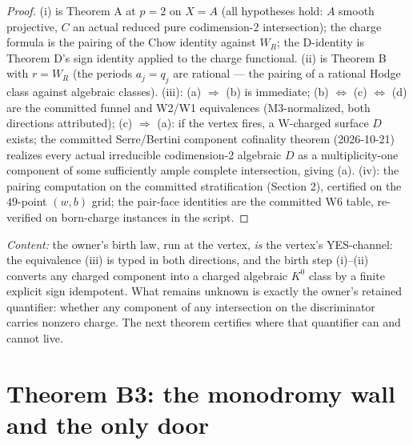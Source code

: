 \documentclass[11pt]{article}
\newcommand{\WR}{W_R}
\newcommand{\KA}{A}
\begin{document}
\begin{proof}
(i) is Theorem A at $p = 2$ on $X = \KA$ (all hypotheses hold: $\KA$ smooth
projective, $C$ an actual reduced pure codimension-2 intersection); the charge
formula is the pairing of the Chow identity against $\WR$; the D-identity is
Theorem D's sign identity applied to the charge functional. (ii) is Theorem B
with $r = \WR$ (the periods $a_j = q_j$ are rational --- the pairing of a
rational Hodge class against algebraic classes). (iii): (a)
$\Rightarrow$ (b) is immediate; (b) $\Leftrightarrow$ (c) $\Leftrightarrow$
(d) are the committed funnel and W2/W1 equivalences (M3-normalized, both
directions attributed); (c) $\Rightarrow$ (a): if the vertex fires, a
W-charged surface $D$ exists; the committed Serre/Bertini component
cofinality theorem (2026-10-21) realizes every actual irreducible
codimension-2 algebraic $D$ as a multiplicity-one component of some
sufficiently ample complete intersection, giving (a). (iv): the pairing
computation on the committed stratification (Section 2), certified on the
$49$-point $(w,b)$ grid; the pair-face identities are the committed W6 table,
re-verified on born-charge instances in the script.
\end{proof}

\emph{Content:} the owner's birth law, run at the vertex, \emph{is} the
vertex's YES-channel: the equivalence (iii) is typed in both directions, and
the birth step (i)--(ii) converts any charged component into a charged
algebraic $K^0$ class by a finite explicit sign idempotent. What remains
unknown is exactly the owner's retained quantifier: whether any component of
any intersection on the discriminator carries nonzero charge. The next
theorem certifies where that quantifier can and cannot live.

\section{Theorem B3: the monodromy wall and the only door}
\end{document}
